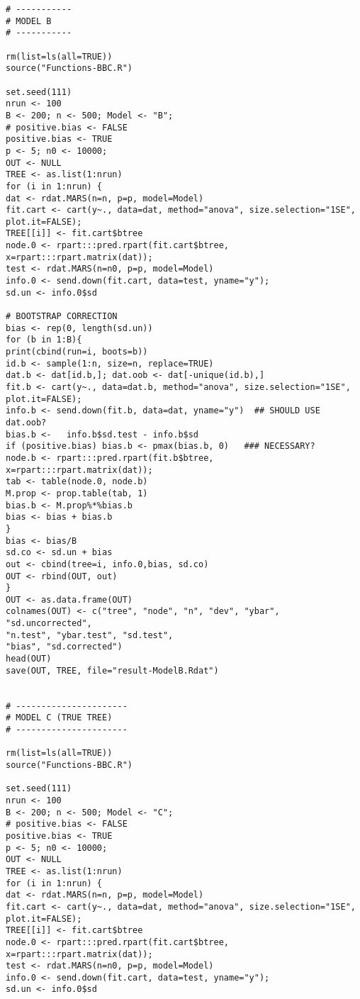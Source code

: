 \begin{enumerate}[A]
\begin{verbatim}
# -----------
# MODEL B
# -----------

rm(list=ls(all=TRUE))
source("Functions-BBC.R")

set.seed(111)
nrun <- 100
B <- 200; n <- 500; Model <- "B"; 
# positive.bias <- FALSE
positive.bias <- TRUE
p <- 5; n0 <- 10000;
OUT <- NULL
TREE <- as.list(1:nrun)
for (i in 1:nrun) {
dat <- rdat.MARS(n=n, p=p, model=Model)
fit.cart <- cart(y~., data=dat, method="anova", size.selection="1SE", plot.it=FALSE);
TREE[[i]] <- fit.cart$btree
node.0 <- rpart:::pred.rpart(fit.cart$btree, x=rpart:::rpart.matrix(dat));
test <- rdat.MARS(n=n0, p=p, model=Model)
info.0 <- send.down(fit.cart, data=test, yname="y"); 
sd.un <- info.0$sd

# BOOTSTRAP CORRECTION
bias <- rep(0, length(sd.un))
for (b in 1:B){
print(cbind(run=i, boots=b))
id.b <- sample(1:n, size=n, replace=TRUE) 
dat.b <- dat[id.b,]; dat.oob <- dat[-unique(id.b),]
fit.b <- cart(y~., data=dat.b, method="anova", size.selection="1SE", plot.it=FALSE);
info.b <- send.down(fit.b, data=dat, yname="y")  ## SHOULD USE dat.oob?
bias.b <-  	info.b$sd.test - info.b$sd
if (positive.bias) bias.b <- pmax(bias.b, 0)   ### NECESSARY?
node.b <- rpart:::pred.rpart(fit.b$btree, x=rpart:::rpart.matrix(dat)); 
tab <- table(node.0, node.b) 
M.prop <- prop.table(tab, 1)
bias.b <- M.prop%*%bias.b
bias <- bias + bias.b
}
bias <- bias/B
sd.co <- sd.un + bias
out <- cbind(tree=i, info.0,bias, sd.co)
OUT <- rbind(OUT, out)
}
OUT <- as.data.frame(OUT)
colnames(OUT) <- c("tree", "node", "n", "dev", "ybar", "sd.uncorrected", 
"n.test", "ybar.test", "sd.test",
"bias", "sd.corrected")
head(OUT)
save(OUT, TREE, file="result-ModelB.Rdat") 


# ----------------------
# MODEL C (TRUE TREE)
# ----------------------

rm(list=ls(all=TRUE))
source("Functions-BBC.R")

set.seed(111)
nrun <- 100
B <- 200; n <- 500; Model <- "C"; 
# positive.bias <- FALSE
positive.bias <- TRUE
p <- 5; n0 <- 10000;
OUT <- NULL
TREE <- as.list(1:nrun)
for (i in 1:nrun) {
dat <- rdat.MARS(n=n, p=p, model=Model)
fit.cart <- cart(y~., data=dat, method="anova", size.selection="1SE", plot.it=FALSE);
TREE[[i]] <- fit.cart$btree
node.0 <- rpart:::pred.rpart(fit.cart$btree, x=rpart:::rpart.matrix(dat));
test <- rdat.MARS(n=n0, p=p, model=Model)
info.0 <- send.down(fit.cart, data=test, yname="y"); 
sd.un <- info.0$sd


\end{verbatim}
\end{enumerate}
